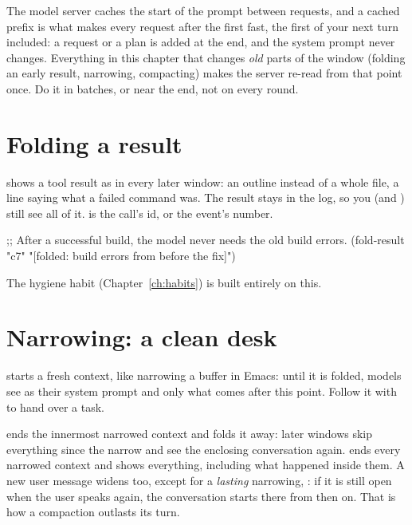 \begin{tip}
The model server caches the start of the prompt between requests, and a
cached prefix is what makes every request after the first fast, the first
of your next turn included: a request or a plan is added at the end, and
the system prompt never changes. Everything
in this chapter that changes \emph{old} parts of the window (folding an
early result, narrowing, compacting) makes the server re-read from that
point once. Do it in batches, or near the end, not on every round.
\end{tip}

\section{Folding a result}

 shows a tool result as  in
every later window: an outline instead of a whole file, a line saying what
a failed command was. The result stays in the log, so you (and
) still see all of it.  is the call's id,
or the  event's number.

\begin{scm}
;; After a successful build, the model never needs the old build errors.
(fold-result "c7" "[folded: build errors from before the fix]")
\end{scm}

The hygiene habit (Chapter~\ref{ch:habits}) is built entirely on this.

\section{Narrowing: a clean desk}

 starts a fresh context, like
narrowing a buffer in Emacs: until it is folded, models see 
as their system prompt and only what comes after this point. Follow it
with  to hand over a task.

 ends the innermost narrowed context and folds it
away: later windows skip everything since the narrow and see the enclosing
conversation again.  ends every narrowed context and shows
everything, including what happened inside them. A new user message widens
too, except for a \emph{lasting} narrowing, : if it is still open when the user speaks again,
the conversation starts there from then on. That is how a compaction
outlasts its turn.

